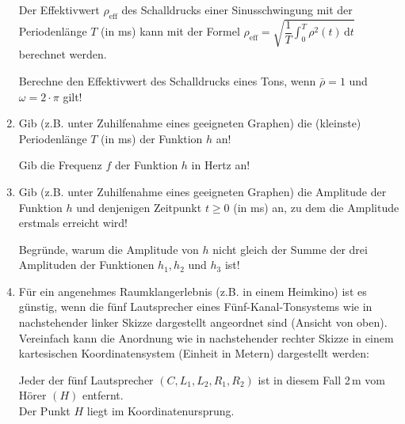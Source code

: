 \begin{langesbeispiel}
\begin{enumerate}
		Der Effektivwert $\rho_{\text{eff}}$ des Schalldrucks einer Sinusschwingung mit der Periodenlänge $T$ (in ms) kann mit der Formel $\rho_{\text{eff}}=\sqrt{\dfrac{1}{T}\displaystyle\int^T_0{\rho^2(t)}\,\text{d}t}$ berechnet werden.
		
		Berechne den Effektivwert des Schalldrucks eines Tons, wenn $\bar{\rho}=1$ und $\omega=2\cdot\pi$ gilt!
		
		\item Gib (z.B. unter Zuhilfenahme eines geeigneten Graphen) die (kleinste) Periodenlänge $T$ (in ms) der Funktion $h$ an!
		
		Gib die Frequenz $f$ der Funktion $h$ in Hertz an!
		
		\item Gib (z.B. unter Zuhilfenahme eines geeigneten Graphen) die Amplitude der Funktion $h$ und denjenigen Zeitpunkt $t\geq 0$ (in ms) an, zu dem die Amplitude erstmals erreicht wird!
		
		Begründe, warum die Amplitude von $h$ nicht gleich der Summe der drei Amplituden der Funktionen $h_1, h_2$ und $h_3$ ist!
		
		\item Für ein angenehmes Raumklangerlebnis (z.B. in einem Heimkino) ist es günstig, wenn die fünf Lautsprecher eines Fünf-Kanal-Tonsystems wie in nachstehender linker Skizze dargestellt angeordnet sind (Ansicht von oben). Vereinfach kann die Anordnung wie in nachstehender rechter Skizze in einem kartesischen Koordinatensystem (Einheit in Metern) dargestellt werden:
		\begin{center}
		\end{center}
		
		Jeder der fünf Lautsprecher $(C, L_1, L_2, R_1, R_2)$ ist in diesem Fall 2\,m vom Hörer $(H)$ entfernt.\\
		Der Punkt $H$ liegt im Koordinatenursprung.
		

\end{enumerate}
\end{langesbeispiel}
